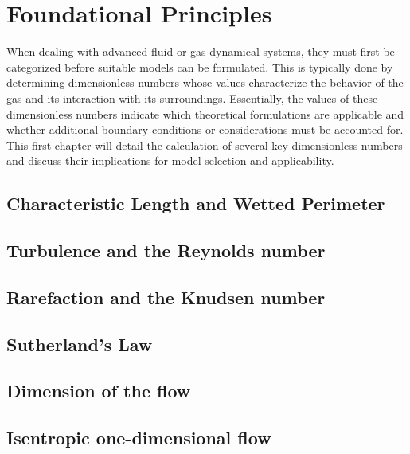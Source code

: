 \section{Foundational Principles}
	When dealing with advanced fluid or gas dynamical systems, they must first be categorized before suitable models can be formulated.
	This is typically done by determining dimensionless numbers whose values characterize the behavior of the gas and its interaction with its surroundings.
	Essentially, the values of these dimensionless numbers indicate which theoretical formulations are applicable and whether additional boundary conditions or considerations must be accounted for.
	This first chapter will detail the calculation of several key dimensionless numbers and discuss their implications for model selection and applicability.

\subsection{Characteristic Length and Wetted Perimeter}\label{sec:characteristic-length}


\subsection{Turbulence and the Reynolds number}\label{sec:reynolds_foundations}


\subsection{Rarefaction and the Knudsen number}\label{sec:knudsen_foundations}


\subsection{Sutherland's Law}


\subsection{Dimension of the flow}\label{sec:flow-dimension-foundations}


\subsection{Isentropic one-dimensional flow}\label{sec:isentropic-1D-foundations}

